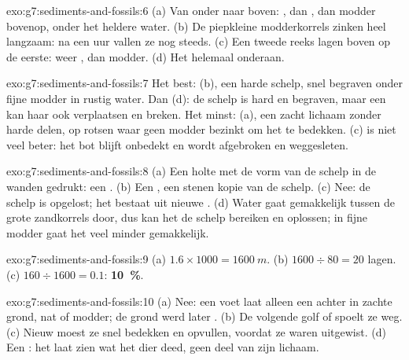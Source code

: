 \begin{solution}{exo:g7:sediments-and-fossils:6}
(a) Van onder naar boven: , dan , dan modder bovenop, onder het
heldere water. (b) De piepkleine modderkorrels zinken heel langzaam: na
een uur vallen ze nog steeds. (c) Een tweede reeks lagen boven op de
eerste: weer , dan modder. (d) Het  helemaal onderaan.
\end{solution}

\begin{solution}{exo:g7:sediments-and-fossils:7}
Het best: (b), een harde schelp, snel begraven onder fijne modder in
rustig water. Dan (d): de schelp is hard en begraven, maar een 
kan haar ook verplaatsen en breken. Het minst: (a), een zacht lichaam
zonder harde delen, op rotsen waar geen modder bezinkt om het te bedekken.
(c) is niet veel beter: het bot blijft onbedekt en wordt afgebroken en
weggesleten.
\end{solution}

\begin{solution}{exo:g7:sediments-and-fossils:8}
(a) Een holte met de vorm van de schelp in de wanden gedrukt: een .
(b) Een , een stenen kopie van de schelp. (c) Nee: de schelp is
opgelost; het  bestaat uit nieuwe . (d) Water gaat
gemakkelijk tussen de grote zandkorrels door, dus kan het de schelp
bereiken en oplossen; in fijne modder gaat het veel minder gemakkelijk.
\end{solution}

\begin{solution}{exo:g7:sediments-and-fossils:9}
(a) $1.6 \times 1000 = \qty{1600}{m}$. (b) $1600 \div 80 = 20$ lagen.
(c) $160 \div 1600 = 0.1$: \textbf{10~\%}.
\end{solution}

\begin{solution}{exo:g7:sediments-and-fossils:10}
(a) Nee: een voet laat alleen een  achter in zachte grond, nat 
of modder; de grond werd later . (b) De volgende golf of
 spoelt ze weg. (c) Nieuw  moest ze snel bedekken en
opvullen, voordat ze waren uitgewist. (d) Een : het laat zien
wat het dier deed, geen deel van zijn lichaam.
\end{solution}

